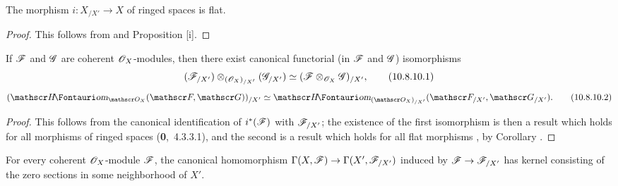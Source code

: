 \begin{corollary}[10.8.9]
\label{1.10.8.9}
The morphism $i:X_{/X'}\to X$ of ringed spaces is flat.
\end{corollary}

\begin{proof}
\label{proof-1.10.8.9}
This follows from  and Proposition [i].
\end{proof}

\begin{corollary}[10.8.10]
\label{1.10.8.10}
If $\mathscr{F}$ and $\mathscr{G}$ are coherent $\mathscr{O}_X$-modules, then there exist canonical functorial (in $\mathscr{F}$ and $\mathscr{G}$) isomorphisms
\begin{equation*}
\label{1.10.8.10.1}
  (\mathscr{F}_{/X'})\otimes_{(\mathscr{O}_X)_{/X'}}(\mathscr{G}_{/X'})\simeq(\mathscr{F}\otimes_{\mathscr{O}_X}\mathscr{G})_{/X'},
  \tag{10.8.10.1}
\end{equation*}
\begin{equation*}
\label{1.10.8.10.2}
  (\shHom_{\sh{O}_X}(\sh{F},\sh{G}))_{/X'}\isoto\shHom_{(\sh{O}_X)_{/X'}}(\sh{F}_{/X'},\sh{G}_{/X'}).
  \tag{10.8.10.2}
\end{equation*}
\end{corollary}

\begin{proof}
\label{proof-1.10.8.10}
This follows from the canonical identification of $i^*(\mathscr{F})$ with $\mathscr{F}_{/X'}$; the existence of the first isomorphism is then a result which holds for all morphisms of ringed spaces (\textbf{0},~4.3.3.1), and the second is a result which holds for all flat morphisms , by Corollary .
\end{proof}

\begin{proposition}[10.8.11]
\label{1.10.8.11}
For every coherent $\mathscr{O}_X$-module $\mathscr{F}$, the canonical homomorphism $\Gamma(X,\sh{F})\to\Gamma(X',\sh{F}_{/X'})$ induced by $\sh{F}\to\sh{F}_{/X'}$ has kernel consisting of the zero sections in some neighborhood of $X'$.
\end{proposition}

